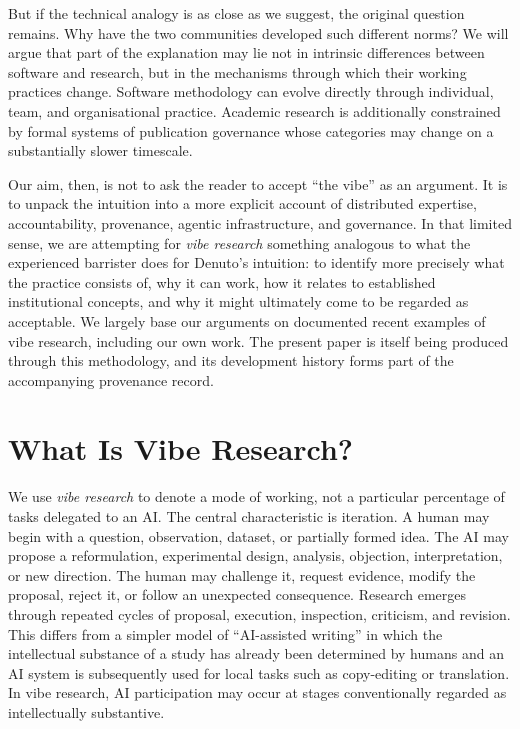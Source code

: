 \documentclass[12pt]{article}
\begin{document}
But if the technical analogy is as close as we suggest, the original question remains. Why have the two communities developed such different norms? We will argue that part of the explanation may lie not in intrinsic differences between software and research, but in the mechanisms through which their working practices change. Software methodology can evolve directly through individual, team, and organisational practice. Academic research is additionally constrained by formal systems of publication governance whose categories may change on a substantially slower timescale.

Our aim, then, is not to ask the reader to accept ``the vibe'' as an argument. It is to unpack the intuition into a more explicit account of distributed expertise, accountability, provenance, agentic infrastructure, and governance. In that limited sense, we are attempting for \emph{vibe research} something analogous to what the experienced barrister does for Denuto's intuition: to identify more precisely what the practice consists of, why it can work, how it relates to established institutional concepts, and why it might ultimately come to be regarded as acceptable.
We largely base our arguments on documented recent examples of vibe research, including our own work. The present paper is itself being produced through this methodology, and its development history forms part of the accompanying provenance record.


\section{What Is Vibe Research?}

We use \emph{vibe research} to denote a mode of working, not a particular percentage of tasks delegated to an AI.
The central characteristic is iteration. A human may begin with a question, observation, dataset, or partially formed idea. The AI may propose a reformulation, experimental design, analysis, objection, interpretation, or new direction. The human may challenge it, request evidence, modify the proposal, reject it, or follow an unexpected consequence. Research emerges through repeated cycles of proposal, execution, inspection, criticism, and revision.
This differs from a simpler model of ``AI-assisted writing'' in which the intellectual substance of a study has already been determined by humans and an AI system is subsequently used for local tasks such as copy-editing or translation. In vibe research, AI participation may occur at stages conventionally regarded as intellectually substantive.
\end{document}
